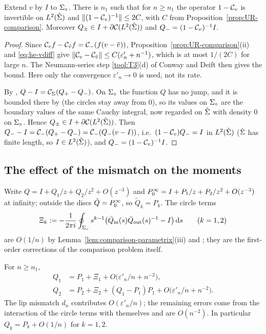 \begin{theorem}\label{thm:UR-true}
Extend $v$ by $I$ to $\Sigma_{\circ}$. There is $n_1$ such that for $n\ge n_1$ the operator $1-\mathcal{C}_v$ is invertible on
$L^2(\hat\Sigma)$ and $\|(1-\mathcal{C}_v)^{-1}\|\le2C$, with $C$ from Proposition~\ref{prop:UR-comparison}. Moreover
$Q_\pm\in I+\partial\mathcal{C}(L^2(\hat\Sigma))$ and $Q_-=(1-\mathcal{C}_v)^{-1}I$.
\end{theorem}

\begin{proof}
Since $\mathcal{C}_vf-\mathcal{C}_{\tilde v}f=\mathcal{C}_-(f(v-\tilde v))$, Proposition~\ref{prop:UR-comparison}(ii) and
\eqref{eq:he-vdiff} give $\|\mathcal{C}_v-\mathcal{C}_{\tilde v}\|\le C(\varepsilon'_n+n^{-1})$, which is at most $1/(2C)$ for
large $n$. The Neumann-series step \ref{tool:T3}(d) of Conway and Deift then gives the bound. Here only the convergence
$\varepsilon'_n\to0$ is used, not its rate.

By , $Q-I=\mathcal{C}_\Sigma(Q_+-Q_-)$. On $\Sigma_{\circ}$ the function $Q$ has no jump, and it is bounded there by 
(the circles stay away from $0$), so its values on $\Sigma_{\circ}$ are the boundary values of the same Cauchy integral, now
regarded on $\hat\Sigma$ with density $0$ on $\Sigma_{\circ}$. Hence $Q_\pm\in I+\partial\mathcal{C}(L^2(\hat\Sigma))$. Then
$Q_--I=\mathcal{C}_-(Q_+-Q_-)=\mathcal{C}_-(Q_-(v-I))$, i.e.\ $(1-\mathcal{C}_v)Q_-=I$ in $L^2(\hat\Sigma)$ ($\hat\Sigma$ has finite length,
so $I\in L^2(\hat\Sigma)$), and $Q_-=(1-\mathcal{C}_v)^{-1}I$.
\end{proof}

\subsection{The effect of the mismatch on the moments}\label{sec:he-moments}

Write $Q=I+Q_1/z+Q_2/z^2+O(z^{-3})$ and $P^\infty_0=I+P_1/z+P_2/z^2+O(z^{-3})$ at infinity; outside the discs $\tilde Q=P^\infty_0$,
so $\tilde Q_k=P_k$. The circle terms
\begin{equation}\label{eq:he-Xi}
  \Xi_k:=-\frac1{2\pi i}\oint_{\Sigma_{\circ}}s^{k-1}\bigl(\tilde Q_{\mathrm{in}}(s)\tilde Q_{\mathrm{out}}(s)^{-1}-I\bigr)\,\mathrm{d} s
  \qquad(k=1,2)
\end{equation}
are $O(1/n)$ by Lemma~\ref{lem:comparison-parametrix}(iii) and ; they are the first-order corrections of the
comparison problem itself.

\begin{proposition}\label{prop:moments}
For $n\ge n_1$,
\begin{align*}
  Q_1&=P_1+\Xi_1+O\bigl(\varepsilon'_n/n+n^{-2}\bigr),\\
  Q_2&=P_2+\Xi_2+(Q_1-P_1)P_1+O\bigl(\varepsilon'_n/n+n^{-2}\bigr).
\end{align*}
The lip mismatch $d_n$ contributes $O(\varepsilon'_n/n)$; the remaining errors come from the interaction of the circle
terms with themselves and are $O(n^{-2})$. In particular $Q_k=P_k+O(1/n)$ for $k=1,2$.
\end{proposition}


